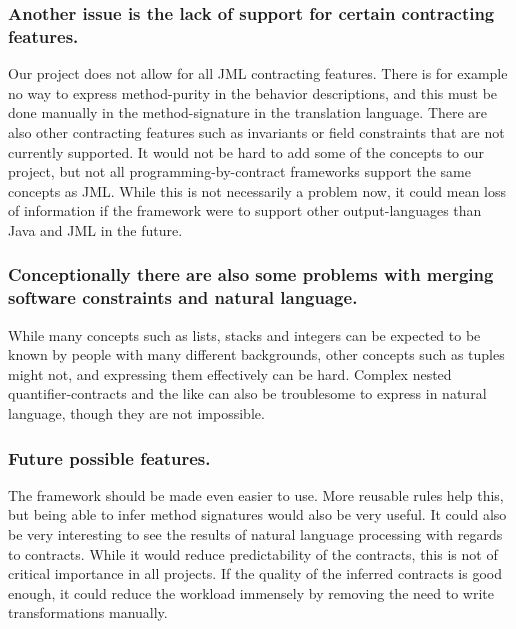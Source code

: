 \subsubsection{Another issue is the lack of support for certain contracting features.}
Our project does not allow for all JML contracting features.
There is for example no way to express method-purity in the behavior descriptions, and this must be done manually in the method-signature in the translation language.
There are also other contracting features such as invariants or field constraints that are not currently supported.
It would not be hard to add some of the concepts to our project, but not all programming-by-contract frameworks support the same concepts as JML.
While this is not necessarily a problem now, it could mean loss of information if the framework were to support other output-languages than Java and JML in the future.

\subsubsection{Conceptionally there are also some problems with merging software constraints and natural language.}
While many concepts such as lists, stacks and integers can be expected to be known by people with many different backgrounds, other concepts such as tuples might not, and expressing them effectively can be hard.
Complex nested quantifier-contracts and the like can also be troublesome to express in natural language, though they are not impossible.

\subsubsection{Future possible features.}
The framework should be made even easier to use.
More reusable rules help this, but being able to infer method signatures would also be very useful.
It could also be very interesting to see the results of natural language processing with regards to contracts.
While it would reduce predictability of the contracts, this is not of critical importance in all projects.
If the quality of the inferred contracts is good enough, it could reduce the workload immensely by removing the need to write transformations manually.
